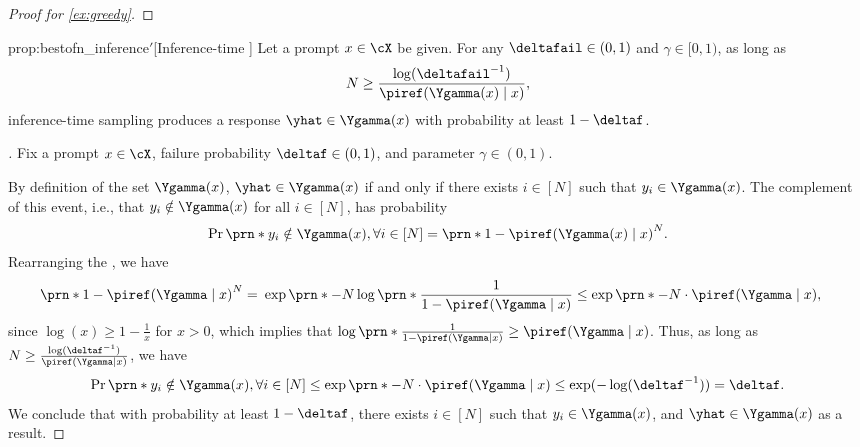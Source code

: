 
\begin{proof}[Proof for \cref{ex:greedy}]
  
\end{proof}

  \begin{propmod}{prop:bestofn_inference}{$'$}[Inference-time \BestofN]
    \label{prop:bestofn_inference_general}
    Let a prompt $x\in\cX$ be given. For any $\deltafail\in(0,1)$ and
    $\gamma\in[0,1)$,
    as long as
        \begin{align}
      N \geq \frac{\log(\deltafail^{-1})}{\piref(\Ygamma(x)\mid{}x)},
        \end{align}
        inference-time \BestofN sampling produces a response
        $
    \yhat\in\Ygamma(x)$ with probability at least $1-\deltaf$.
  \end{propmod}

\begin{proof}[]
    Fix a prompt $x \in \cX$, failure probability $\deltaf \in (0, 1)$,
    and parameter $\gamma\in(0,1)$.
    
    By definition of the set $\Ygamma(x)$, $\yhat \in \Ygamma(x)$ if
    and only if there exists $i \in [N]$ such that $y_i\in\Ygamma(x)$. The complement of this event, i.e., that $y_i \notin \Ygamma(x)$ for all $i \in [N]$, has probability 
    \begin{align}
        \Pr\prn*{y_i \notin \Ygamma(x),{}\forall i \in [N]} = \prn*{1 - \piref(\Ygamma(x)\mid{}x)}^N.
    \end{align}
    Rearranging the \rhs, we have 
    \begin{align}
        \prn*{1 - \piref(\Ygamma\mid{}x)}^N 
        =&~ 
        \exp\prn*{-N\log\prn*{\frac{1}{1-\piref(\Ygamma\mid{}x)}}}
        \le
        \exp\prn*{-N\cdot\piref(\Ygamma\mid{}x)},
    \end{align}
    since $\log(x) \ge 1-\frac{1}{x}$ for $x > 0$, which implies that $\log\prn*{\frac{1}{1-\piref(\Ygamma\mid{}x)}} \ge \piref(\Ygamma\mid{}x)$. 
    Thus, as long as $N \ge
    \frac{\log(\deltaf^{-1})}{\piref(\Ygamma\mid{}x)}$, we have
    \begin{align}
        \Pr\prn*{y_i \notin \Ygamma(x),{}\forall i \in [N]} 
        \le 
        \exp\prn*{-N\cdot\piref(\Ygamma\mid{}x)}
        \le 
        \exp(-\log(\deltaf^{-1})) = \deltaf. 
    \end{align}
    We conclude that with probability at least $1-\deltaf$, there exists $i \in [N]$ such that $y_i \in \Ygamma(x)$, and $\yhat \in \Ygamma(x)$ as a result.  

\end{proof}

